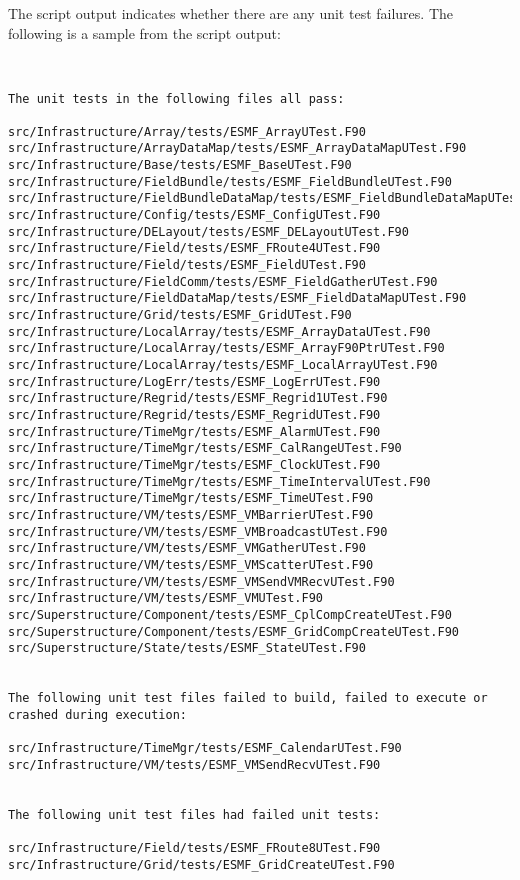 The script output indicates whether there are any unit test failures.
The following is a sample from the script output:

\begin{verbatim}


The unit tests in the following files all pass:

src/Infrastructure/Array/tests/ESMF_ArrayUTest.F90
src/Infrastructure/ArrayDataMap/tests/ESMF_ArrayDataMapUTest.F90
src/Infrastructure/Base/tests/ESMF_BaseUTest.F90
src/Infrastructure/FieldBundle/tests/ESMF_FieldBundleUTest.F90
src/Infrastructure/FieldBundleDataMap/tests/ESMF_FieldBundleDataMapUTest.F90
src/Infrastructure/Config/tests/ESMF_ConfigUTest.F90
src/Infrastructure/DELayout/tests/ESMF_DELayoutUTest.F90
src/Infrastructure/Field/tests/ESMF_FRoute4UTest.F90
src/Infrastructure/Field/tests/ESMF_FieldUTest.F90
src/Infrastructure/FieldComm/tests/ESMF_FieldGatherUTest.F90
src/Infrastructure/FieldDataMap/tests/ESMF_FieldDataMapUTest.F90
src/Infrastructure/Grid/tests/ESMF_GridUTest.F90
src/Infrastructure/LocalArray/tests/ESMF_ArrayDataUTest.F90
src/Infrastructure/LocalArray/tests/ESMF_ArrayF90PtrUTest.F90
src/Infrastructure/LocalArray/tests/ESMF_LocalArrayUTest.F90
src/Infrastructure/LogErr/tests/ESMF_LogErrUTest.F90
src/Infrastructure/Regrid/tests/ESMF_Regrid1UTest.F90
src/Infrastructure/Regrid/tests/ESMF_RegridUTest.F90
src/Infrastructure/TimeMgr/tests/ESMF_AlarmUTest.F90
src/Infrastructure/TimeMgr/tests/ESMF_CalRangeUTest.F90
src/Infrastructure/TimeMgr/tests/ESMF_ClockUTest.F90
src/Infrastructure/TimeMgr/tests/ESMF_TimeIntervalUTest.F90
src/Infrastructure/TimeMgr/tests/ESMF_TimeUTest.F90
src/Infrastructure/VM/tests/ESMF_VMBarrierUTest.F90
src/Infrastructure/VM/tests/ESMF_VMBroadcastUTest.F90
src/Infrastructure/VM/tests/ESMF_VMGatherUTest.F90
src/Infrastructure/VM/tests/ESMF_VMScatterUTest.F90
src/Infrastructure/VM/tests/ESMF_VMSendVMRecvUTest.F90
src/Infrastructure/VM/tests/ESMF_VMUTest.F90
src/Superstructure/Component/tests/ESMF_CplCompCreateUTest.F90
src/Superstructure/Component/tests/ESMF_GridCompCreateUTest.F90
src/Superstructure/State/tests/ESMF_StateUTest.F90


The following unit test files failed to build, failed to execute or 
crashed during execution:

src/Infrastructure/TimeMgr/tests/ESMF_CalendarUTest.F90
src/Infrastructure/VM/tests/ESMF_VMSendRecvUTest.F90


The following unit test files had failed unit tests:

src/Infrastructure/Field/tests/ESMF_FRoute8UTest.F90
src/Infrastructure/Grid/tests/ESMF_GridCreateUTest.F90



\end{verbatim}
